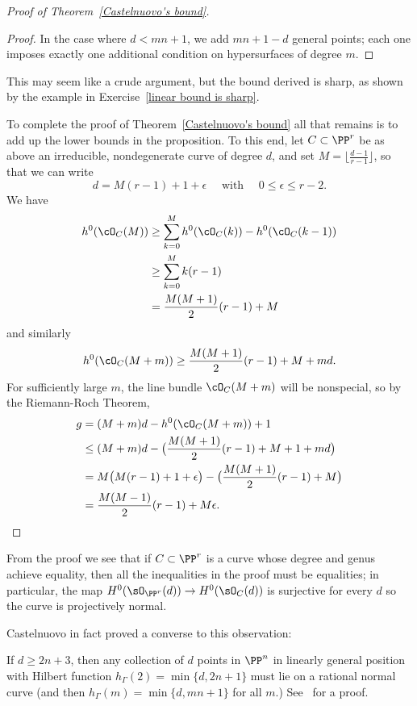 \begin{proof}[Proof of Theorem~\ref{Castelnuovo's bound}]
\begin{proof}
In the case where $d<mn+1$, we add $mn+1-d$ general points; each one imposes exactly one
additional condition on hypersurfaces of degree $m$.
\end{proof}

This may seem like a crude argument, but the bound derived is sharp, as shown by the example in Exercise~\ref{linear bound is sharp}.

To complete the proof of Theorem~\ref{Castelnuovo's bound} all that remains is to add up the lower bounds in the proposition. To this end, let $C \subset \PP^r$ be as above an irreducible, nondegenerate curve of degree $d$, and set $M = \lfloor{\frac{d-1}{r-1}}\rfloor$, so that we can write
$$
d = M(r-1) + 1 + \epsilon \quad \text{ with } \quad 0 \leq \epsilon \leq r-2.
$$
We have 
\begin{align*}
h^0(\cO_C(M)) &\geq \sum_{k=0}^M h^0(\cO_C(k)) - h^0(\cO_C(k-1)) \\
&\geq  \sum_{k=0}^M k(r-1)\\%
&= \frac{M(M+1)}{2}(r-1) + M%
\end{align*}
and similarly
$$
h^0(\cO_C(M+m)) \geq \frac{M(M+1)}{2}(r-1) + M  + md.%
$$
For sufficiently large $m$, the line bundle $\cO_C(M+m)$ will be nonspecial, so by the Riemann-Roch Theorem,
\begin{align*}
g &= (M+m)d - h^0(\cO_C(M+m)) + 1 \\
&\leq (M+m)d - \bigl(  \frac{M(M+1)}{2}(r-1) + M + 1 + md \bigr) \\
& = M\bigl( M(r-1) + 1 + \epsilon \bigr) - \bigl(  \frac{M(M+1)}{2}(r-1) + M  \bigr) \\%
&= \frac{M(M-1)}{2}(r-1) + M\epsilon.
\end{align*}
 \end{proof}

From the proof we see that if  $C\subset \PP^r$ is a curve whose degree and genus achieve equality, then all the inequalities in the proof
must be equalities; in particular, the map $H^0(\sO_{\PP^r}(d)) \to H^0(\sO_C(d))$ is surjective for every $d$ so the curve is
projectively normal.


Castelnuovo in fact proved a converse to this observation:

\begin{fact}
If $d \geq 2n+3$, then any collection of $d$ points in $\PP^n$ in linearly general position with Hilbert function $h_\Gamma(2) = \min\{d, 2n+1\}$ must lie on a rational normal curve (and then $h_\Gamma(m) = \min\{d, mn+1\}$ for all $m$.) See~\cite[Lemma 3.9]{MR685427} for a proof.
\end{fact}
 
